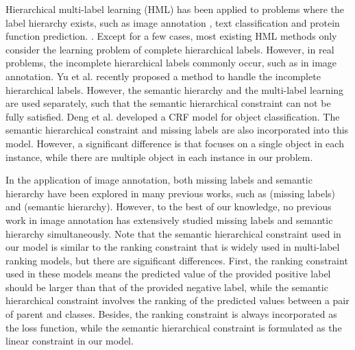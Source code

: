 \documentclass[twocolumn]{svjour3}          %
\begin{document}
Hierarchical multi-label learning (HML) \cite{ML-reivew-2014} has been applied to problems where the label hierarchy exists, such as image annotation \cite{hierarchy-image-annotation-review-pr-2012}, text classification \cite{hml-text-icml-2005,kernel-hml-text-jmlr-2006} and protein function prediction.
\cite{bi-wei-icml-2011,yu-incomplete-hierarchy-bmc-2015}.
%
Except for a few cases, most existing HML methods only consider the learning problem of complete hierarchical labels. However, in real problems, the incomplete hierarchical labels commonly occur, such as in image annotation. 
%
Yu et al. \cite{yu-incomplete-hierarchy-bmc-2015} recently proposed a method to handle the incomplete hierarchical labels. 
However, the semantic hierarchy and the multi-label learning are used separately, such that the semantic hierarchical constraint can not be fully satisfied. 
Deng et al. \cite{deng-eccv-2014} developed a CRF model for object classification. The semantic hierarchical constraint and missing labels are also incorporated into this model. However, a significant difference is that \cite{deng-eccv-2014} focuses on a single object in each instance, while there are multiple object in each instance in our problem.

In the application of image annotation, both missing labels and semantic hierarchy have been explored in many previous works, such as 
\cite{well-multi-label-weak-2010,bucak-multi-incomplete-2011,fasttag-icml-2013,tag-completion-pami-2013,image-tag-missing-cvpr-2013,video-annotation-icm-2008,L1-label-denoising-bmvc-2016,my-aaai-2016-imbalance,li-au-missing-pr-2016} (missing labels) and \cite{hierarchy-image-annotation-review-pr-2012,my-cvpr-2017-dia,my-cvpr-2018-d2ia-gan} (semantic hierarchy).  
%
However, to the best of our knowledge, no previous work in image annotation has extensively studied missing labels and semantic hierarchy simultaneously. 
%
Note that the semantic hierarchical constraint used in our model is similar to the ranking constraint 
\cite{ML-calibrated-ranking-2008,bucak-multi-incomplete-2011}
 that is widely used in multi-label ranking models, but there are significant differences. First, the ranking constraint used in these models means the predicted value of the provided positive label should be larger than that of the provided negative label, while the semantic hierarchical constraint involves the ranking of the predicted values between a pair of parent and classes. Besides, the ranking constraint is always incorporated as the loss function, while the semantic hierarchical constraint is formulated as the linear constraint in our model.
\end{document}
